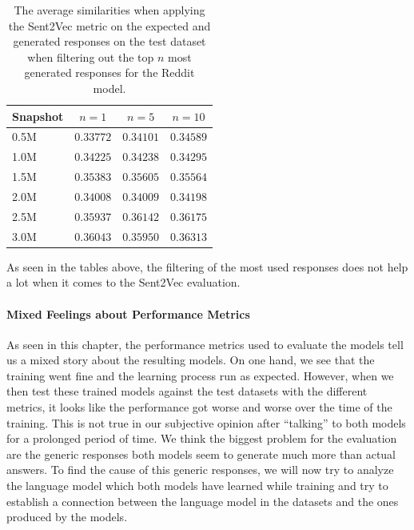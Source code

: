 \begin{table}[H]
	\centering
	\begin{adjustbox}{max width=\textwidth}
		\begin{tabular}{lccc}
			\toprule
			Snapshot & $n = 1$ & $n = 5$ & $n = 10$\\
			\midrule
			0.5M & $0.33772$ & $0.34101$ & $0.34589$\\
			1.0M & $0.34225$ & $0.34238$ & $0.34295$\\
			1.5M & $0.35383$ & $0.35605$ & $0.35564$\\
			2.0M & $0.34008$ & $0.34009$ & $0.34198$\\
			2.5M & $0.35937$ & $0.36142$ & $0.36175$\\
			3.0M & $0.36043$ & $0.35950$ & $0.36313$\\
			\bottomrule
		\end{tabular}
	\end{adjustbox}
	\caption{The average similarities when applying the Sent2Vec metric on the expected and generated responses on the test dataset when filtering out the top $n$ most generated responses for the Reddit model.}
	\label{results:sent2vec:reddit:top_n_results_table}
\end{table}

As seen in the tables above, the filtering of the most used responses does not help a lot when it comes to the Sent2Vec evaluation.

\paragraph{Mixed Feelings about Performance Metrics} As seen in this chapter, the performance metrics used to evaluate the models tell us a mixed story about the resulting models. On one hand, we see that the training went fine and the learning process run as expected. However, when we then test these trained models against the test datasets with the different metrics, it looks like the performance got worse and worse over the time of the training. This is not true in our subjective opinion after ``talking'' to both models for a prolonged period of time. We think the biggest problem for the evaluation are the generic responses both models seem to generate much more than actual answers. To find the cause of this generic responses, we will now try to analyze the language model which both models have learned while training and try to establish a connection between the language model in the datasets and the ones produced by the models.

